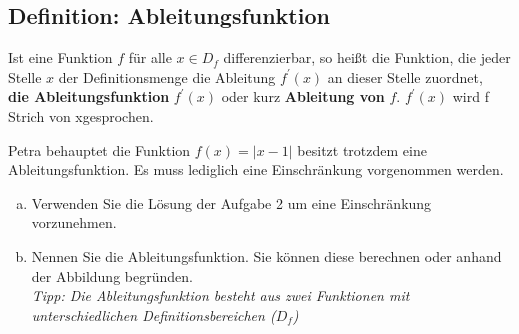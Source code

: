 			\subsection*{Definition: Ableitungsfunktion}
			\begin{tcolorbox}
				Ist eine Funktion $f$ für alle $x\in D_f$ differenzierbar, so heißt die Funktion, die jeder Stelle $x$ der Definitionsmenge die Ableitung $f^\prime(x)$ an dieser Stelle zuordnet,\\
				
				\textbf{die Ableitungsfunktion} $f^\prime(x)$ oder kurz \textbf{Ableitung von} $f$.
				\tcblower
				  $f^\prime(x)$ wird \glqq f Strich von x\grqq gesprochen.  
			\end{tcolorbox}\vspace{-0.3cm}
			Petra behauptet die Funktion $f(x)=\left\vert x-1\right\vert$ besitzt trotzdem eine Ableitungsfunktion. Es muss lediglich eine Einschränkung vorgenommen werden.
			\begin{enumerate}[a)]
				\item Verwenden Sie die Lösung der Aufgabe 2 um eine Einschränkung vorzunehmen.
				\item Nennen Sie die Ableitungsfunktion. Sie können diese berechnen oder anhand der Abbildung begründen. \\

				\textit{Tipp: Die Ableitungsfunktion besteht aus zwei Funktionen mit unterschiedlichen Definitionsbereichen ($D_f$)}
			\end{enumerate}
			


